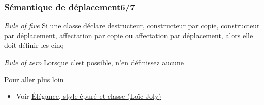 \documentclass[C++.tex]{subfiles}
\begin{document}
\begin{frame}
	\frametitle{Sémantique de déplacement\titlehfill{}6/7}
	\begin{block}{\textit{Rule of five}}
		Si une classe déclare destructeur, constructeur par copie, constructeur par déplacement, affectation par copie ou affectation par déplacement, alors elle doit définir les cinq

	\end{block}

	\begin{block}{\textit{Rule of zero}}
		Lorsque c'est possible, n'en définissez aucune

	\end{block}

	\begin{block}{Pour aller plus loin}
		\begin{itemize}
			\item Voir \href{https://github.com/cppp-france/CPPP-19/blob/master/elegance_style_epure_et_classe-Loic_Joly/elegance_style_epure_et_classe-Loic_Joly.pdf}{Élégance, style épuré et classe (Loïc Joly)}
		\end{itemize}
	\end{block}
\end{frame}
\end{document}
